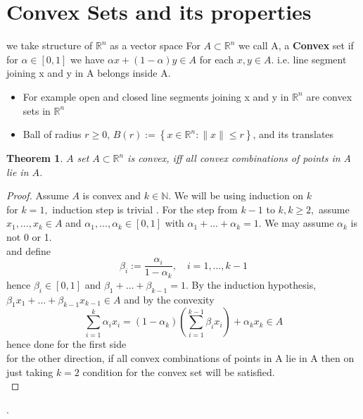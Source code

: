 \documentclass[oneside]{book}
\newtheorem{theorem}{Theorem}[section]
\begin{document}
	
	\section{Convex Sets and its properties } \label{s:4}
	we take structure of  $\mathbb{R}^n$ as a vector space 
	For $ A \subset \mathbb{R}^n$ we call A, a \textbf{Convex} set  if for $\alpha \in [0,1]$ we have $\alpha x +(1- \alpha)y \in A $ for each  $x, y \in A.$  i.e. line segment joining x and y in A belongs inside A.\\
	\begin{itemize}
		\item  For example open and closed line segments joining x and y in $\mathbb{R}^n$ are convex sets in $\mathbb{R}^n$
		
		\item  
		
		Ball of radius $r \geq 0$,  $B (r):=\left\{x \in \mathbb{R}^{n}:\|x\| \leq r\right\}$,  and its translates
		
	\end{itemize}
	
	
	\begin{theorem}
		\label{t:4.5}
		$A$ set $A \subset \mathbb{R}^{n}$ is convex, iff  all convex combinations of points in A lie
		in $A$.
	\end{theorem}
	
	\begin{proof}
		
		Assume $A$ is convex and $k \in \mathbb{N} .$ We will be using induction on $k$ \\ for $k=1,$ induction step is trivial  . For the step from $k-1$ to $k, k \geq 2,$ assume $x_{1}, \ldots, x_{k} \in A$ and $\alpha_{1}, \ldots, \alpha_{k} \in[0,1]$ with $\alpha_{1}+\ldots+\alpha_{k}=1 .$ We may assume $\alpha_{k}$ is not 0 or 1.\\ and define 
		$$
		\beta_{i}:=\frac{\alpha_{i}}{1-\alpha_{k}}, \quad i=1, \ldots, k-1
		$$
		hence $\beta_{i} \in[0,1]$ and $\beta_{1}+\ldots+\beta_{k-1}=1 .$ By the induction hypothesis, $\beta_{1} x_{1}+\ldots+\beta_{k-1} x_{k-1} \in A$
		and by the convexity
		$$
		\sum_{i=1}^{k} \alpha_{i} x_{i}=\left(1-\alpha_{k}\right)\left(\sum_{i=1}^{k-1} \beta_{i} x_{i}\right)+\alpha_{k} x_{k} \in A
		$$
		hence done for the first side\\
		for the other direction, if all convex combinations of points in A lie in A then on just taking $k =2$ condition for the convex set will be satisfied.\\
		
	\end{proof}.
	
\end{document}
